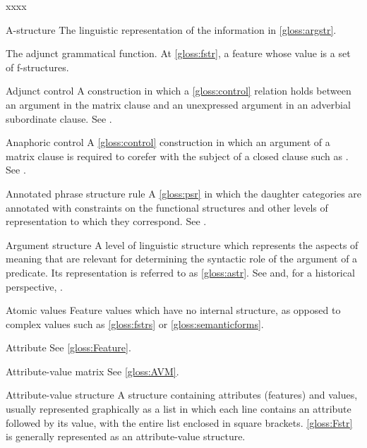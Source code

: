 \documentclass[output=paper,colorlinks,citecolor=brown]{langscibook}
\begin{document}
\begin{labeling}{xxxx}
\item[A-structure\namedlabel{gloss:astr}{A-structure}] The linguistic representation of the information in \ref{gloss:argstr}.

\item[\ADJ\namedlabel{gloss:adj}{\ADJ}] The adjunct grammatical function.  At \ref{gloss:fstr}, a feature whose value is a set of f-structures.

\item[Adjunct control\namedlabel{gloss:adjunct}{adjunct}] A construction in which a \ref{gloss:control} relation holds between an argument in the matrix clause and an unexpressed argument in an adverbial subordinate clause.  See .
  
\item[Anaphoric control\namedlabel{gloss:anaphcontrol}{anaphoric control}\namedlabel{gloss:Anaphcontrol}{Anaphoric control}] A \ref{gloss:control} construction in which an argument of a matrix clause is required to corefer with the subject of a closed clause such as \COMP.  See .  

\item[Annotated phrase structure rule] A \ref{gloss:psr} in which the daughter categories are annotated with constraints on the functional structures and other levels of representation to which they correspond.  See \citetv[\ref{sect:intro:annotated}]{chapters/Intro}.

\item[Argument structure\namedlabel{gloss:Argstr}{Argument
    structure}\namedlabel{gloss:argstr}{argument structure}] A level
  of linguistic structure which represents the aspects of meaning that
  are relevant for determining the syntactic role of the argument of a
  predicate. Its representation is referred to as \ref{gloss:astr}.  See  and, for a historical perspective,
  \citetv[\ref{sec:Historical:arg-gf}]{chapters/Historical}.

\item[Atomic values] Feature values which have no internal structure, as opposed to complex values such as \ref{gloss:fstrs} or \ref{gloss:semanticforms}.

\item[Attribute] See \ref{gloss:Feature}.

\item[Attribute-value matrix] See \ref{gloss:AVM}.

\item[Attribute-value structure\namedlabel{gloss:avm}{attribute-value structure}\namedlabel{gloss:avms}{attribute-value structures}\namedlabel{gloss:AVM}{Attribute-value structure}] A structure containing attributes (features) and values, usually represented graphically as a list in which each line contains an attribute followed by its value, with the entire list enclosed in square brackets. \ref{gloss:Fstr} is generally represented as an attribute-value structure.


\end{labeling}
\end{document}
